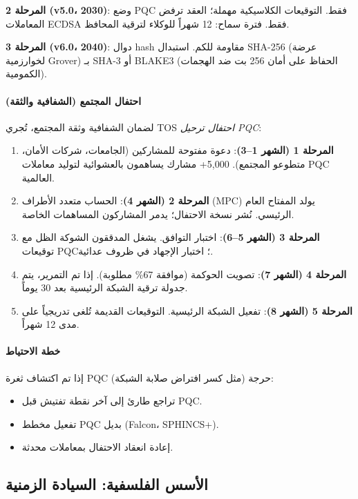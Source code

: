\documentclass[11pt]{article}
\begin{document}
\textbf{المرحلة 2 (v5.0، 2030)}: وضع PQC فقط. التوقيعات الكلاسيكية مهملة؛ العقد ترفض المعاملات ECDSA فقط. فترة سماح: 12 شهراً للوكلاء لترقية المحافظ.

\textbf{المرحلة 3 (v6.0، 2040)}: دوال hash مقاومة للكم. استبدال SHA-256 (عرضة لخوارزمية Grover) بـ SHA-3 أو BLAKE3 (الحفاظ على أمان 256 بت ضد الهجمات الكمومية).

\paragraph{احتفال المجتمع (الشفافية والثقة)}
لضمان الشفافية وثقة المجتمع، تُجري TOS \emph{احتفال ترحيل PQC}:
\begin{enumerate}[noitemsep]
  \item \textbf{المرحلة 1 (الشهر 1--3)}: دعوة مفتوحة للمشاركين (الجامعات، شركات الأمان، متطوعو المجتمع). 5,000+ مشارك يساهمون بالعشوائية لتوليد معاملات PQC العالمية.
  \item \textbf{المرحلة 2 (الشهر 4)}: الحساب متعدد الأطراف (MPC) يولد المفتاح العام الرئيسي. نُشر نسخة الاحتفال؛ يدمر المشاركون المساهمات الخاصة.
  \item \textbf{المرحلة 3 (الشهر 5--6)}: اختبار التوافق. يشغل المدققون الشوكة الظل مع توقيعات PQC؛ اختبار الإجهاد في ظروف عدائية.
  \item \textbf{المرحلة 4 (الشهر 7)}: تصويت الحوكمة (موافقة 67\% مطلوبة). إذا تم التمرير، يتم جدولة ترقية الشبكة الرئيسية بعد 30 يوماً.
  \item \textbf{المرحلة 5 (الشهر 8)}: تفعيل الشبكة الرئيسية. التوقيعات القديمة تُلغى تدريجياً على مدى 12 شهراً.
\end{enumerate}

\paragraph{خطة الاحتياط}
إذا تم اكتشاف ثغرة PQC حرجة (مثل كسر افتراض صلابة الشبكة):
\begin{itemize}[noitemsep]
  \item تراجع طارئ إلى آخر نقطة تفتيش قبل PQC.
  \item تفعيل مخطط PQC بديل (Falcon، SPHINCS+).
  \item إعادة انعقاد الاحتفال بمعاملات محدثة.
\end{itemize}

\subsection{الأسس الفلسفية: السيادة الزمنية}
\end{document}

